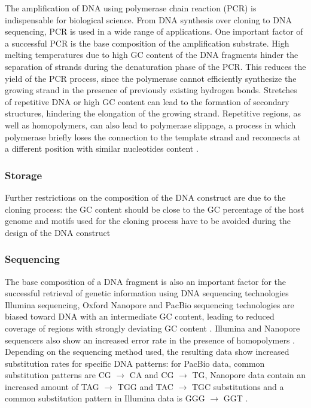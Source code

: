 The amplification of DNA using polymerase chain reaction (PCR) is indispensable for biological science. From DNA synthesis over cloning to DNA sequencing, PCR is used in a wide range of applications. 
One important factor of a successful PCR is the base composition of the amplification substrate. High melting temperatures due to high GC content of the DNA fragments hinder the separation of strands during the denaturation phase of the PCR. 
This reduces the yield of the PCR process, since the polymerase cannot efficiently synthesize the growing strand in the presence of previously existing hydrogen bonds. 
Stretches of repetitive DNA or high GC content can lead to the formation of secondary structures, hindering the elongation of the growing strand. 
Repetitive regions, as well as homopolymers, can also lead to polymerase slippage, a process in which polymerase briefly loses the connection to the template strand and reconnects at a different position with similar nucleotides content \cite{bib:102144}.

\subsubsection{Storage}

Further restrictions on the composition of the DNA construct are due to the cloning process: the GC content should be close to the GC percentage of the host genome and motifs used for the cloning process have to be avoided during the design of the DNA construct

\subsubsection{Sequencing}

The base composition of a DNA fragment is also an important factor for the successful retrieval of genetic information using DNA sequencing technologies
Illumina sequencing, Oxford Nanopore and PacBio sequencing technologies are biased toward DNA with an intermediate GC content, leading to reduced coverage of regions with strongly deviating GC content \cite{bib:101093}. 
Illumina and Nanopore sequencers also show an increased error rate in the presence of homopolymers \cite{bib:101093}.
Depending on the sequencing method used, the resulting data show increased substitution rates for specific DNA patterns: for PacBio data, common substitution patterns are CG $\rightarrow$ CA and CG $\rightarrow$ TG, Nanopore data contain an increased amount of TAG $\rightarrow$ TGG and TAC $\rightarrow$ TGC substitutions \cite{bib:1012688} and a common substitution pattern in Illumina data is GGG $\rightarrow$ GGT \cite{bib:101186}.



